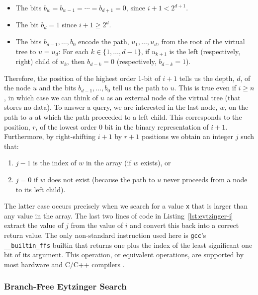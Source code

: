 \documentclass{patmorin}
\newcommand{\lstref}[1]{Listing~\ref{lst:#1}}
\begin{document}
\begin{itemize}
  \item The bits $b_w=b_{w-1}=\cdots=b_{d+1}=0$, since $i+1 < 2^{d+1}$.
  \item The bit $b_d=1$ since $i+1\ge 2^d$.
  \item The bits $b_{d-1},\ldots,b_{0}$ encode the path,
    $u_1,\ldots,u_{d}$, from the root of the virtual tree to
    $u=u_{d}$: For each $k\in\{1,\ldots,d-1\}$, if $u_{k+1}$ is the left
    (respectively, right) child of $u_k$, then $b_{d-k}=0$ (respectively,
    $b_{d-k}=1$).
\end{itemize}

Therefore, the position of the highest order 1-bit of $i+1$  tells
us the depth, $d$, of the node $u$ and the bits $b_{d-1},\ldots,b_{0}$ tell
us the path to $u$.  This is true even if $i\ge n$, in which case we
can think of $u$ as an external node of the virtual tree (that stores
no data).  To answer a query, we are interested in the last node,
$w$, on the path to $u$ at which the path proceeded to a left child.
This corresponds to the position, $r$, of the lowest order 0 bit in the
binary representation of $i+1$.  Furthermore, by right-shifting $i+1$
by $r+1$ positions we obtain an integer $j$ such that:

\begin{enumerate}
  \item $j-1$ is the index of $w$ in the array (if $w$ exists), or
  \item $j=0$ if $w$ does not exist (because the path to $u$ never proceeds 
        from a node to its left child).
\end{enumerate}

The latter case occurs precisely when we search for a value
\texttt{x} that is larger than any value in the array. The
last two lines of code in \lstref{eytzinger-i} extract the value of $j$
from the value of $i$ and convert this back into a correct return value.
The only non-standard instruction used here is \texttt{gcc}'s
\texttt{__builtin_ffs} builtin that returns one plus the index
of the least significant one bit of its argument.  This operation,
or equivalent operations, are supported by most hardware and C/C++
compilers \cite{wiki:find}.

\subsubsection{Branch-Free Eytzinger Search}
\end{document}
